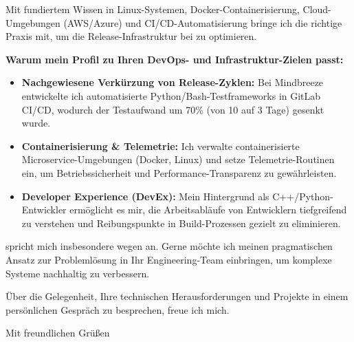 \documentclass[11pt,a4paper]{article}
\begin{document}
Mit fundiertem Wissen in Linux-Systemen, Docker-Containerisierung, Cloud-Umgebungen (AWS/Azure) und CI/CD-Automatisierung bringe ich die richtige Praxis mit, um die Release-Infrastruktur bei \textbf{\firmenName} zu optimieren.

\textbf{Warum mein Profil zu Ihren DevOps- und Infrastruktur-Zielen passt:}

\begin{itemize}[leftmargin=1.2em, itemsep=0.15em, parsep=0pt, topsep=0.2em]
    \item \textbf{Nachgewiesene Verkürzung von Release-Zyklen:} Bei Mindbreeze entwickelte ich automatisierte Python/Bash-Testframeworks in GitLab CI/CD, wodurch der Testaufwand um 70\% (von 10 auf 3 Tage) gesenkt wurde.
    \item \textbf{Containerisierung \& Telemetrie:} Ich verwalte containerisierte Microservice-Umgebungen (Docker, Linux) und setze Telemetrie-Routinen ein, um Betriebssicherheit und Performance-Transparenz zu gewährleisten.
    \item \textbf{Developer Experience (DevEx):} Mein Hintergrund als C++/Python-Entwickler ermöglicht es mir, die Arbeitsabläufe von Entwicklern tiefgreifend zu verstehen und Reibungspunkte in Build-Prozessen gezielt zu eliminieren.
\end{itemize}

\firmenFlussbezug spricht mich insbesondere wegen \textit{\firmenHighlight} an. Gerne möchte ich meinen pragmatischen Ansatz zur Problemlösung in Ihr Engineering-Team einbringen, um komplexe Systeme nachhaltig zu verbessern.

Über die Gelegenheit, Ihre technischen Herausforderungen und Projekte in einem persönlichen Gespräch zu besprechen, freue ich mich.

\vspace{0.6em}

Mit freundlichen Grüßen

\vspace{1.2em}

\textbf{\meinName}
\end{document}
